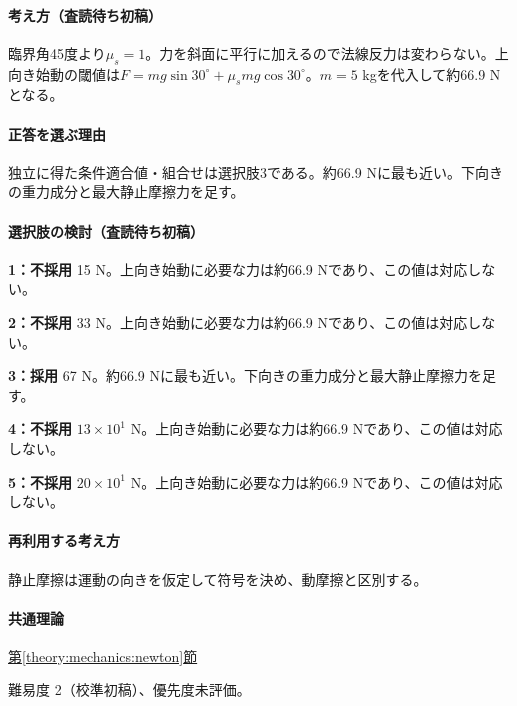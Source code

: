 \paragraph{考え方（査読待ち初稿）} 臨界角45度より\(\mu_s=1\)。力を斜面に平行に加えるので法線反力は変わらない。上向き始動の閾値は\(F=mg\sin30^\circ+\mu_smg\cos30^\circ\)。\(m=5\) kgを代入して約66.9 Nとなる。

\paragraph{正答を選ぶ理由} 独立に得た条件適合値・組合せは選択肢3である。約66.9 Nに最も近い。下向きの重力成分と最大静止摩擦力を足す。

\paragraph{選択肢の検討（査読待ち初稿）}

\noindent\textbf{1：不採用} 15 N。上向き始動に必要な力は約66.9 Nであり、この値は対応しない。\par

\noindent\textbf{2：不採用} 33 N。上向き始動に必要な力は約66.9 Nであり、この値は対応しない。\par

\noindent\textbf{3：採用} 67 N。約66.9 Nに最も近い。下向きの重力成分と最大静止摩擦力を足す。\par

\noindent\textbf{4：不採用} \(13\times10^1\) N。上向き始動に必要な力は約66.9 Nであり、この値は対応しない。\par

\noindent\textbf{5：不採用} \(20\times10^1\) N。上向き始動に必要な力は約66.9 Nであり、この値は対応しない。\par

\paragraph{再利用する考え方} 静止摩擦は運動の向きを仮定して符号を決め、動摩擦と区別する。

\paragraph{共通理論} \hyperref[theory:mechanics:newton]{第\ref*{theory:mechanics:newton}節}

\par 難易度 2（校準初稿）、優先度未評価。

